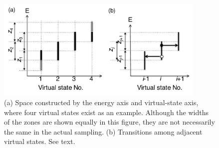 \begin{figure}
  \centering
  \includegraphics[width=10cm]{../enhance_rev/figures/vstate_transi.pdf}
  \caption{\label{fig:vstate_transi_fig} (a) Space constructed by the energy axis and virtual-state axis, where four virtual states exist as an example. Although the widths of the zones are shown equally in this figure, they are not necessarily the same in the actual sampling. (b) Transitions among adjacent virtual states. See text.}
\end{figure}
